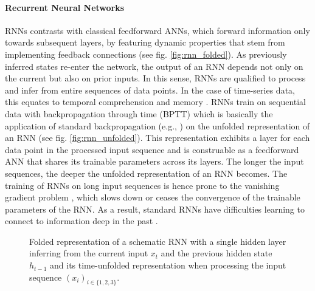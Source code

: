 \paragraph*{Recurrent Neural Networks} ${}$\\
RNNs contrasts with classical feedforward ANNs, 
which forward information only towards subsequent layers, 
by featuring dynamic properties that stem 
from implementing feedback connections
\cite{Hu2008} (see fig. \ref{fig:rnn_folded}).
As previously inferred states re-enter the network, 
the output of an RNN depends not only on the current 
but also on prior inputs. 
In this sense, RNNs are qualified to process and infer from 
entire sequences of data points. 
In the case of time-series data, 
this equates to temporal comprehension and memory \cite{ICE2020}.
RNNs train on sequential data with backpropagation through time (BPTT) 
\cite{pascanu2013difficulty}
which is basically the application of standard backpropagation
(e.g., \cite{Rojas1996})
on the unfolded representation of an RNN
(see fig. \ref{fig:rnn_unfolded}).
This representation exhibits a layer 
for each data point in the processed input sequence 
and is construable as a feedforward ANN 
that shares its trainable parameters across its layers. 
The longer the input sequences,
the deeper the unfolded representation of an RNN becomes. 
The training of RNNs on long input sequences 
is hence prone to the 
vanishing gradient problem \cite{hochreiter1991untersuchungen},
which slows down or ceases the convergence 
of the trainable parameters of the RNN.
As a result, standard RNNs have difficulties 
learning to connect to information deep in the past \cite{Bengio1994}.
\begin{figure}[h]
    \centering
    \hspace*{2cm}                
    \caption[
        Folded and unfolded representation of an RNN
    ]{
        Folded representation of a 
        schematic RNN with a single hidden layer 
        inferring from the current input $x_t$
        and the previous hidden state $h_{t-1}$
        and its time-unfolded representation
        when processing the input sequence
        $\left(x_i\right)_{i\in\{1, 2, 3\}}$.
        \label{fig:rnn_folded_unfolded}
    }
\end{figure}




